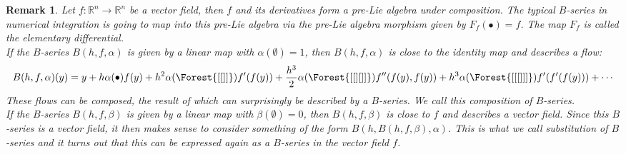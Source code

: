 \documentclass[10pt,a4paper]{article}
\newtheorem{remark}{Remark}
\begin{document}
\begin{remark}\cite{ChartierHairerVilmart2005} \cite{ChartierHairerVilmart2010}
\label{rmk:vectorfields2}
Let $f: \mathbb{R}^n \to \mathbb{R}^n$ be a vector field, then $f$ and its derivatives form a pre-Lie algebra under composition. The typical $B$-series in numerical integration is going to map into this pre-Lie algebra via the pre-Lie algebra morphism given by $F_f(\bullet)=f$. The map $F_f$ is called the elementary differential. \\
If the $B$-series $B(h,f,\alpha)$ is given by a linear map with $\alpha(\emptyset)=1$, then $B(h,f,\alpha)$ is close to the identity map and describes a flow:
\begin{align*}
B(h,f,\alpha)(y)=y+h\alpha(\bullet)f(y)+h^2\alpha(\Forest{[[]]})f'(f(y))+\frac{h^3}{2}\alpha(\Forest{[[][]]})f''(f(y),f(y))+h^3\alpha(\Forest{[[[]]]})f'(f'(f(y)))+\cdots
\end{align*}
These flows can be composed, the result of which can surprisingly be described by a $B$-series. We call this composition of $B$-series. \\
If the $B$-series $B(h,f,\beta)$ is given by a linear map with $\beta(\emptyset)=0$, then $B(h,f,\beta)$ is close to $f$ and describes a vector field. Since this $B$-series is a vector field, it then makes sense to consider something of the form $B(h,B(h,f,\beta),\alpha)$. This is what we call substitution of $B$-series and it turns out that this can be expressed again as a $B$-series in the vector field $f$.
\end{remark}
\end{document}
